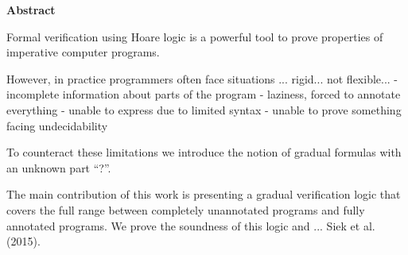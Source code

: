 
\begin{center}
\begin{minipage}{0.7\textwidth}
\vspace*{15\baselineskip}
\begin{center}
\textbf{Abstract}
\end{center}
Formal verification using Hoare logic is a powerful tool to prove properties of imperative computer programs.


However, in practice programmers often face situations  ... rigid... not flexible...
- incomplete information about parts of the program
- laziness, forced to annotate everything
- unable to express due to limited syntax
- unable to prove something facing undecidability

To counteract these limitations we introduce the notion of gradual formulas with an unknown part ``?''.

The main contribution of this work is presenting a gradual verification logic that covers the full range between completely unannotated programs and fully annotated programs.
We prove the soundness of this logic and ... Siek et al. (2015).
\end{minipage}
\end{center}

